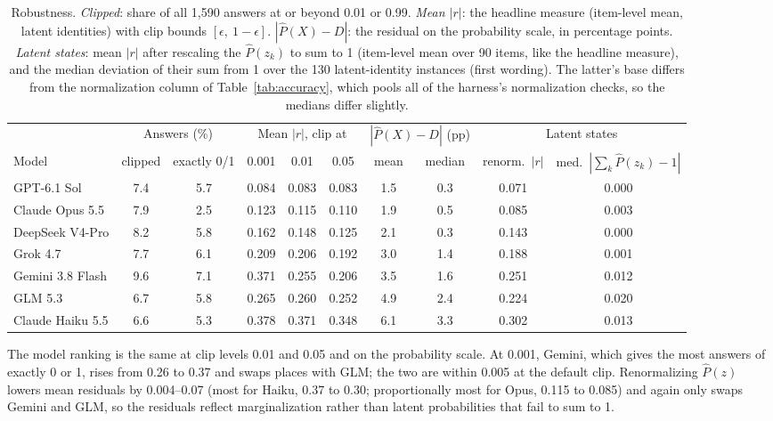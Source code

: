 \documentclass[11pt]{article}
\newcommand{\phat}{\hat{P}}
\begin{document}
\begin{table}[H]
\centering\footnotesize
\setlength{\tabcolsep}{4.5pt}
\begin{tabular}{@{}lccccccccc@{}}
\toprule
 & \multicolumn{2}{c}{Answers (\%)} & \multicolumn{3}{c}{Mean $|r|$, clip at} & \multicolumn{2}{c}{$|\phat(X)-D|$ (pp)} & \multicolumn{2}{c}{Latent states} \\
\cmidrule(lr){2-3}\cmidrule(lr){4-6}\cmidrule(lr){7-8}\cmidrule(l){9-10}
Model & clipped & exactly 0/1 & 0.001 & 0.01 & 0.05 & mean & median & renorm.\ $|r|$ & med.\ $|\sum_k\phat(z_k)-1|$ \\
\midrule
GPT-6.1 Sol & 7.4 & 5.7 & 0.084 & 0.083 & 0.083 & 1.5 & 0.3 & 0.071 & 0.000 \\
Claude Opus 5.5 & 7.9 & 2.5 & 0.123 & 0.115 & 0.110 & 1.9 & 0.5 & 0.085 & 0.003 \\
DeepSeek V4-Pro & 8.2 & 5.8 & 0.162 & 0.148 & 0.125 & 2.1 & 0.3 & 0.143 & 0.000 \\
Grok 4.7 & 7.7 & 6.1 & 0.209 & 0.206 & 0.192 & 3.0 & 1.4 & 0.188 & 0.001 \\
Gemini 3.8 Flash & 9.6 & 7.1 & 0.371 & 0.255 & 0.206 & 3.5 & 1.6 & 0.251 & 0.012 \\
GLM 5.3 & 6.7 & 5.8 & 0.265 & 0.260 & 0.252 & 4.9 & 2.4 & 0.224 & 0.020 \\
Claude Haiku 5.5 & 6.6 & 5.3 & 0.378 & 0.371 & 0.348 & 6.1 & 3.3 & 0.302 & 0.013 \\
\bottomrule
\end{tabular}
\caption{Robustness. \emph{Clipped}: share of all 1,590 answers at or beyond 0.01 or 0.99. \emph{Mean $|r|$}: the headline measure (item-level mean, latent identities) with clip bounds $[\epsilon,\ 1-\epsilon]$. \emph{$|\phat(X)-D|$}: the residual on the probability scale, in percentage points. \emph{Latent states}: mean $|r|$ after rescaling the $\phat(z_k)$ to sum to 1 (item-level mean over 90 items, like the headline measure), and the median deviation of their sum from 1 over the 130 latent-identity instances (first wording). The latter's base differs from the normalization column of Table~\ref{tab:accuracy}, which pools all of the harness's normalization checks, so the medians differ slightly.}
\label{tab:robust}
\end{table}

The model ranking is the same at clip levels 0.01 and 0.05 and on the probability scale. At 0.001, Gemini, which gives the most answers of exactly 0 or 1, rises from 0.26 to 0.37 and swaps places with GLM; the two are within 0.005 at the default clip. Renormalizing $\phat(z)$ lowers mean residuals by 0.004--0.07 (most for Haiku, 0.37 to 0.30; proportionally most for Opus, 0.115 to 0.085) and again only swaps Gemini and GLM, so the residuals reflect marginalization rather than latent probabilities that fail to sum to 1.
\end{document}
